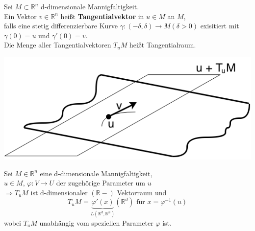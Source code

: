 \begin{definition}
Sei $M \subset \mathbb{R}^n $ d-dimensionale Mannigfaltigkeit. \\
Ein Vektor $v \in \mathbb{R}^n $ heißt \textbf{Tangentialvektor} in $u \in M $ an $M$, \\
falls eine stetig differenzierbare Kurve 
$\gamma: (-\delta, \delta) \rightarrow M (\delta > 0) $ exisitiert mit \\
$\gamma (0) = u $ und $\gamma' (0) = v $. \\
Die Menge aller Tangentialvektoren $T_uM$ heißt Tangentialraum.\\
\begin{center}
\includegraphics[scale=0.5]{pictures/MA2_0013}\\
\end{center}
\end{definition}

\begin{satz}
Sei $M \in \mathbb{R}^n $ eine d-dimensionale Mannigfaltigkeit, \\
$u \in M $, $ \varphi : V \rightarrow U $ der zugehörige Parameter um $u$ \\
$\Longrightarrow T_uM $ ist d-dimensionaler $( \mathbb{R}-) $ Vektorraum und \\
    \begin{equation}
    T_uM = \underbrace{\varphi'(x)}_{L \left( \mathbb{R}^d, \mathbb{R}^n \right) }
    \left( \mathbb{R}^d \right) \text{ für } x = \varphi^{-1} (u) 
    \end{equation}
wobei $T_uM$ unabhängig vom speziellen Parameter $\varphi$ ist.
\end{satz}

